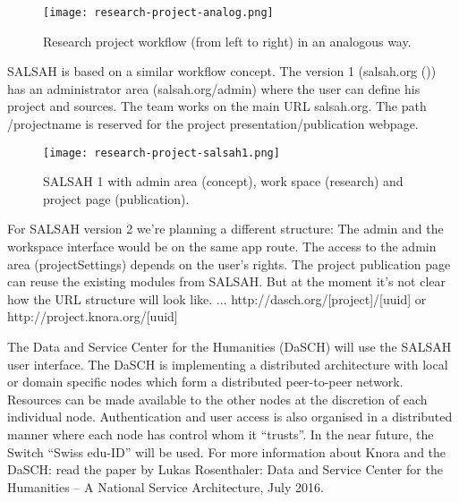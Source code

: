 \documentclass[12pt]{article} %
\begin{document}
\begin{figure}[h]
    \centering
    \texttt{[image: research-project-analog.png]}
    \caption{Research project workflow (from left to right) in an analogous way.}
\end{figure}
\newpage

SALSAH is based on a similar workflow concept. The version 1 (salsah.org (\todayDDMMYYYY)) has an administrator area (salsah.org/admin) where the user can define his project and sources. The team works on the main URL salsah.org. The path /projectname is reserved for the project presentation/publication webpage.

\begin{figure}[h]
    \centering
    \texttt{[image: research-project-salsah1.png]}
    \caption{SALSAH 1 with admin area (concept), work space (research) and project page (publication).}
\end{figure}

For SALSAH version 2 we're planning a different structure: The admin and the workspace interface would be on the same app route. The access to the admin area (projectSettings) depends on the user's rights. The project publication page can reuse the existing modules from SALSAH. But at the moment it's not clear how the URL structure will look like. ... http://dasch.org/[project]/[uuid] or http://project.knora.org/[uuid] 


The Data and Service Center for the Humanities (DaSCH) will use the SALSAH user interface. The DaSCH is implementing a distributed architecture with local or domain specific nodes which form a distributed peer-to-peer network. Resources can be made available to the other nodes at the discretion of each individual node. Authentication and user access is also organised in a distributed manner where each node has control whom it ``trusts''. In the near future, the Switch ``Swiss edu-ID'' will be used. For more information about Knora and the DaSCH: read the paper by Lukas Rosenthaler: Data and Service Center for the Humanities -- A National Service Architecture, July 2016.

\end{document}
